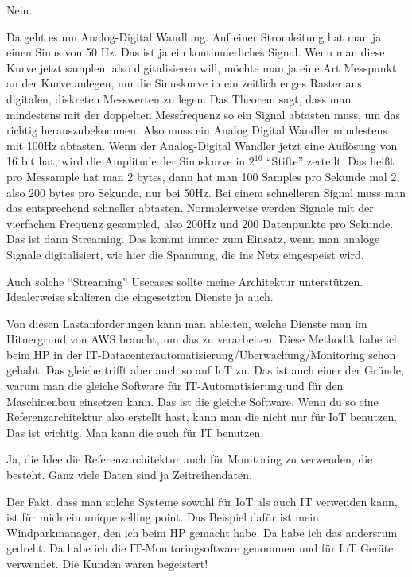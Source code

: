\LF Nein.

\PE Da geht es um Analog-Digital Wandlung. Auf einer Stromleitung hat man ja einen Sinus von 50 Hz. Das ist ja ein kontinuierliches Signal. Wenn man diese Kurve jetzt samplen, also digitalisieren will, möchte man ja eine Art Messpunkt an der Kurve anlegen, um die Sinuskurve in ein zeitlich enges Raster aus digitalen, diskreten Messwerten zu legen. Das Theorem sagt, dass man mindestens  mit der doppelten Messfrequenz so ein Signal abtasten muss, um das richtig herauszubekommen. Also muss ein Analog Digital Wandler mindestens mit 100Hz abtasten. Wenn der Analog-Digital Wandler jetzt eine Auflösung von 16 bit hat, wird die Amplitude der Sinuskurve in $2^{16}$ \enquote{Stifte} zerteilt. Das heißt pro Messample hat man 2 bytes, dann hat man 100 Samples pro Sekunde mal 2, also 200 bytes pro Sekunde, nur bei 50Hz. Bei einem schnelleren Signal muss man das entsprechend schneller abtasten. Normalerweise werden Signale mit der vierfachen Frequenz gesampled, also 200Hz und 200 Datenpunkte pro Sekunde. Das ist dann Streaming. Das kommt immer zum Einsatz, wenn man analoge Signale digitalisiert, wie hier die Spannung, die  ins Netz eingespeist wird.

\LF Auch solche \enquote{Streaming} Usecases sollte meine Architektur unterstützen. Idealerweise skalieren die eingesetzten Dienste ja auch.

\PE Von diesen Lastanforderungen kann man ableiten, welche Dienste man im Hitnergrund von \ac{AWS} braucht, um das zu verarbeiten. Diese Methodik habe ich beim HP in der IT-Datacenterautomatisierung/Überwachung/Monitoring schon gehabt. Das gleiche trifft aber auch so auf \ac{IoT} zu. Das ist auch einer der Gründe, warum man die gleiche Software für IT-Automatisierung und für den Maschinenbau einsetzen kann. Das ist die gleiche Software. Wenn du so eine Referenzarchitektur also erstellt hast, kann man die nicht nur für \ac{IoT} benutzen. Das ist wichtig. Man kann die auch für IT benutzen.

\LF Ja, die Idee die Referenzarchitektur auch für Monitoring zu verwenden, die besteht. Ganz viele Daten sind ja Zeitreihendaten.

\PE Der Fakt, dass man solche Systeme sowohl für \ac{IoT} als auch IT verwenden kann, ist für mich ein unique selling point. Das Beispiel dafür ist mein Windparkmanager, den ich beim HP gemacht habe. Da habe ich das andersrum gedreht. Da habe ich die IT-Monitoringsoftware genommen und für \ac{IoT} Geräte verwendet. Die Kunden waren begeistert! 

